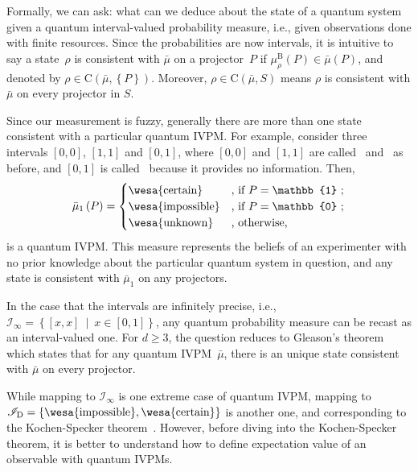 \documentclass[english,reprint, aps, prl,superscriptaddress, showpacs,
showkeys, longbibliography, amsmath, amssymb]{revtex4-1}
\theoremstyle{plain}
\theoremstyle{definition}
\newcommand{\imposs}{{\text{\wesa{impossible}}}}
\newcommand{\necess}{{\text{\wesa{certain}}}}
\newcommand{\unknown}{{\text{\wesa{unknown}}}}
\newcommand{\set}[2]{\ensuremath{\left\{ {#1}~\middle|~{#2}\right\} }}
\newcommand{\coreBorn}{\ensuremath{\mathrm{C}}}
\begin{document}
Formally, we can ask: what can we deduce about the state of a quantum
system given a quantum interval-valued probability measure, i.e.,
given observations done with finite resources. Since the probabilities
are now intervals, it is intuitive to say a state~$\rho$ is consistent
with $\bar{\mu}$ on a projector~$P$ if $\mu_{\rho}^{\mathrm{B}}\left(P\right)\in\bar{\mu}\left(P\right)$,
and denoted by $\rho\in\coreBorn\left(\bar{\mu},\left\{ P\right\} \right)$.
Moreover, $\rho\in\coreBorn\left(\bar{\mu},S\right)$ means $\rho$
is consistent with $\bar{\mu}$ on every projector in $S$. 

Since our measurement is fuzzy, generally there are more than one
state consistent with a particular quantum IVPM. For example, consider
three intervals $\left[0,0\right]$, $\left[1,1\right]$ and \emph{$\left[0,1\right]$},
where $\left[0,0\right]$ and $\left[1,1\right]$ are called \imposs~and
\necess~as before, and \emph{$\left[0,1\right]$} is called \unknown~because
it provides no information. Then,
\begin{equation}
\bar{\mu}_{1}\left(P\right)=\begin{cases}
\necess & \text{, if }P=\mathbb{1}\text{ ;}\\
\imposs & \text{, if }P=\mathbb{0}\text{ ;}\\
\unknown & \text{, otherwise,}
\end{cases}\label{eq:homomorphism-1}
\end{equation}
is a quantum IVPM. This measure represents the beliefs of an experimenter
with no prior knowledge about the particular quantum system in question,
and any state is consistent with $\bar{\mu}_{1}$ on any projectors.

In the case that the intervals are infinitely precise, i.e., $\mathscr{I}_{\infty}=\set{\left[x,x\right]}{x\in\left[0,1\right]}$,
any quantum probability measure can be recast as an interval-valued
one. For $d\ge3$, the question reduces to Gleason's theorem which
states that for any quantum IVPM~$\bar{\mu}$, there is an unique
state consistent with $\bar{\mu}$ on every projector.

While mapping to $\mathscr{I}_{\infty}$ is one extreme case of quantum
IVPM, mapping to $\mathscr{I}_{\mathrm{D}}=\left\{ \imposs,\necess\right\} $
is another one, and corresponding to the Kochen-Specker theorem~\cite{kochenspecker1967,peres1995quantum,Redhead1987-REDINA,Griffiths2003}.
However, before diving into the Kochen-Specker theorem, it is better
to understand how to define expectation value of an observable with
quantum IVPMs.
\end{document}
